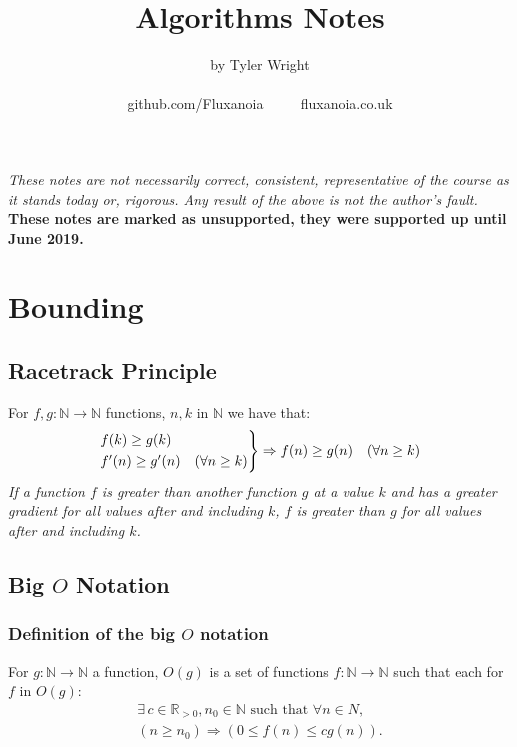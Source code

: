 \documentclass[a4paper, 12pt, twoside]{article}
\begin{document}
\title{Algorithms Notes}
\date{}
\author{by Tyler Wright \\
  \\
  github.com/Fluxanoia $\qquad$ fluxanoia.co.uk
}
\maketitle

\vfill

\textit{These notes are not necessarily correct,
consistent, representative of the course as it stands today or, 
rigorous. Any result of the above is not the author's fault.}
\\[\baselineskip]
\textbf{These notes are marked as unsupported, they were supported
up until June 2019.}

\newpage

\section{Bounding}

\subsection{Racetrack Principle}

For $f, g : \mathbb{N} \to \mathbb{N}$ functions, $n, k$ in $\mathbb{N}$
we have that:
\begin{align*}
      \begin{rcases*}
            f(k) \geq g(k) \\
            f'(n) \geq g'(n) \quad (\forall n \geq k)
      \end{rcases*} \Rightarrow
      f(n) \geq g(n) \quad (\forall n \geq k)
\end{align*}
\textit{If a function $f$ is greater than another function $g$ 
at a value $k$ and has a greater gradient for all values after
and including $k$, $f$ is greater than $g$ for all values 
after and including $k$.}

\subsection{Big $O$ Notation}

\subsubsection{Definition of the big $O$ notation}

For $g : \mathbb{N} \to \mathbb{N}$ a function, $O(g)$ is a set of
functions $f : \mathbb{N} \to \mathbb{N}$ such that each for
$f$ in $O(g)$:
\begin{gather*}
      \exists \, c \in \mathbb{R}_{>0}, n_0 \in \mathbb{N}
      \text{ such that } \forall n \in N, \\
      (n \geq n_0) \Rightarrow (0 \leq f(n) \leq cg(n)).
\end{gather*}
\end{document}

